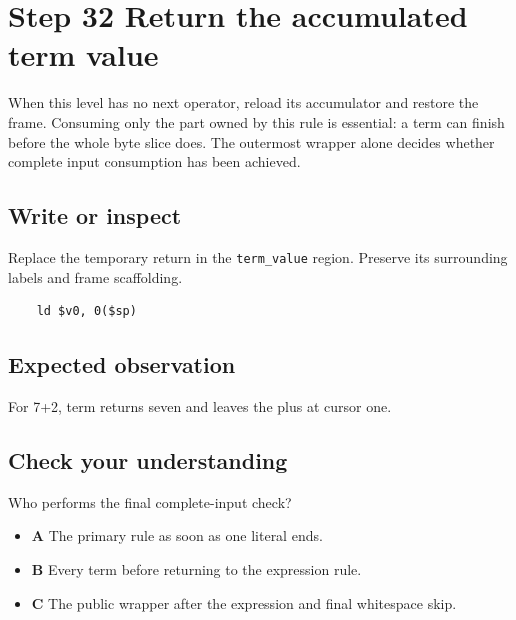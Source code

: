 \section{Step 32 Return the accumulated term value}\label{expression-s32}

When this level has no next operator, reload its accumulator and restore the frame. Consuming only the part owned by this rule is essential: a term can finish before the whole byte slice does. The outermost wrapper alone decides whether complete input consumption has been achieved.

\subsection{Write or inspect}
Replace the temporary return in the \texttt{term\_value} region. Preserve its surrounding labels and frame scaffolding.

\begin{verbatim}
    ld $v0, 0($sp)
\end{verbatim}
\subsection{Expected observation}
For 7+2, term returns seven and leaves the plus at cursor one.

\subsection{Check your understanding}
Who performs the final complete-input check?

\begin{itemize}
  \item \textbf{A} The primary rule as soon as one literal ends.
  \item \textbf{B} Every term before returning to the expression rule.
  \item \textbf{C} The public wrapper after the expression and final whitespace skip.
\end{itemize}
